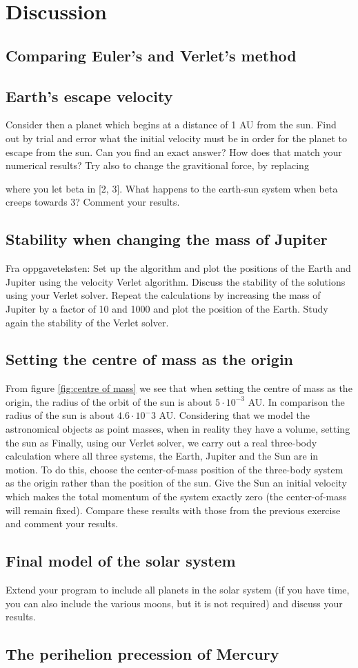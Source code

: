 \section{Discussion}
\label{sec:discussion}

\subsection{Comparing Euler's and Verlet's method}

\subsection{Earth's escape velocity}
Consider then a planet which begins at a
distance of 1 AU from the sun. Find out by trial and error what the initial
velocity must be in order for the planet to escape from the sun. Can you find an
exact answer? How does that match your numerical results?
Try also to change the gravitional force, by replacing

where you let beta in [2, 3]. What happens to the earth-sun system when beta creeps
towards 3? Comment your results.


\subsection{Stability when changing the mass of Jupiter}

Fra oppgaveteksten: Set up the algorithm and plot the positions of
the Earth and Jupiter using the velocity Verlet algorithm. Discuss the stability
of the solutions using your Verlet solver.
Repeat the calculations by increasing the mass of Jupiter by a factor of 10
and 1000 and plot the position of the Earth. Study again the stability of the
Verlet solver.

\subsection{Setting the centre of mass as the origin}
From figure \ref{fig:centre of mass} we see that when setting the centre of mass as the origin, the radius of the orbit of the sun is about $5\cdot 10^{-3}$ AU. In comparison the radius of the sun is about $4.6\cdot 10^-3{}$ AU. Considering that we model the astronomical objects as point masses, when in reality they have a volume, setting the sun as 
Finally,
using our Verlet solver, we carry out a real three-body calculation where all
three systems, the Earth, Jupiter and the Sun are in motion. To do this, choose
the center-of-mass position of the three-body system as the origin rather than
the position of the sun. Give the Sun an initial velocity which makes the total
momentum of the system exactly zero (the center-of-mass will remain fixed).
Compare these results with those from the previous exercise and comment your
results.

\subsection{Final model of the solar system}
Extend your program to include all planets in the solar system (if you
have time, you can also include the various moons, but it is not required) and
discuss your results.


\subsection{The perihelion precession of Mercury}
